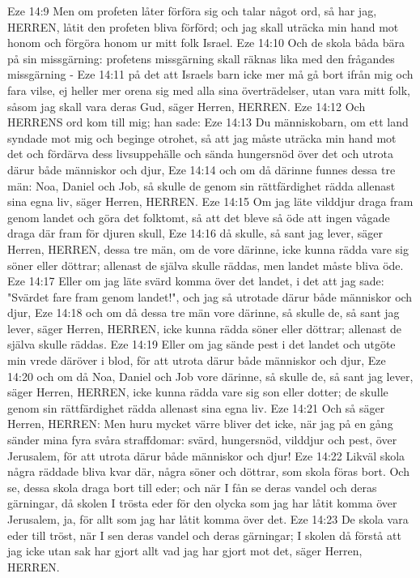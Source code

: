 Eze 14:9  Men om profeten låter förföra sig och talar något ord, så har jag, HERREN, låtit den profeten bliva förförd; och jag skall uträcka min hand mot honom och förgöra honom ur mitt folk Israel.
Eze 14:10  Och de skola båda bära på sin missgärning: profetens missgärning skall räknas lika med den frågandes missgärning -
Eze 14:11  på det att Israels barn icke mer må gå bort ifrån mig och fara vilse, ej heller mer orena sig med alla sina överträdelser, utan vara mitt folk, såsom jag skall vara deras Gud, säger Herren, HERREN.
Eze 14:12  Och HERRENS ord kom till mig; han sade:
Eze 14:13  Du människobarn, om ett land syndade mot mig och beginge otrohet, så att jag måste uträcka min hand mot det och fördärva dess livsuppehälle och sända hungersnöd över det och utrota därur både människor och djur,
Eze 14:14  och om då därinne funnes dessa tre män: Noa, Daniel och Job, så skulle de genom sin rättfärdighet rädda allenast sina egna liv, säger Herren, HERREN.
Eze 14:15  Om jag läte vilddjur draga fram genom landet och göra det folktomt, så att det bleve så öde att ingen vågade draga där fram för djuren skull,
Eze 14:16  då skulle, så sant jag lever, säger Herren, HERREN, dessa tre män, om de vore därinne, icke kunna rädda vare sig söner eller döttrar; allenast de själva skulle räddas, men landet måste bliva öde.
Eze 14:17  Eller om jag läte svärd komma över det landet, i det att jag sade: "Svärdet fare fram genom landet!", och jag så utrotade därur både människor och djur,
Eze 14:18  och om då dessa tre män vore därinne, så skulle de, så sant jag lever, säger Herren, HERREN, icke kunna rädda söner eller döttrar; allenast de själva skulle räddas.
Eze 14:19  Eller om jag sände pest i det landet och utgöte min vrede däröver i blod, för att utrota därur både människor och djur,
Eze 14:20  och om då Noa, Daniel och Job vore därinne, så skulle de, så sant jag lever, säger Herren, HERREN, icke kunna rädda vare sig son eller dotter; de skulle genom sin rättfärdighet rädda allenast sina egna liv.
Eze 14:21  Och så säger Herren, HERREN: Men huru mycket värre bliver det icke, när jag på en gång sänder mina fyra svåra straffdomar: svärd, hungersnöd, vilddjur och pest, över Jerusalem, för att utrota därur både människor och djur!
Eze 14:22  Likväl skola några räddade bliva kvar där, några söner och döttrar, som skola föras bort. Och se, dessa skola draga bort till eder; och när I fån se deras vandel och deras gärningar, då skolen I trösta eder för den olycka som jag har låtit komma över Jerusalem, ja, för allt som jag har låtit komma över det.
Eze 14:23  De skola vara eder till tröst, när I sen deras vandel och deras gärningar; I skolen då förstå att jag icke utan sak har gjort allt vad jag har gjort mot det, säger Herren, HERREN.
